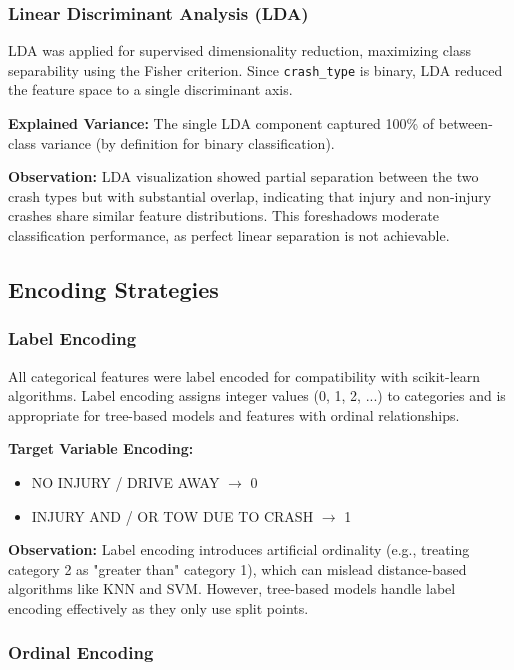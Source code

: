 \documentclass[12pt,man]{apa7}
\begin{document}
\subsubsection{Linear Discriminant Analysis (LDA)}

LDA was applied for supervised dimensionality reduction, maximizing class separability using the Fisher criterion. Since \texttt{crash\_type} is binary, LDA reduced the feature space to a single discriminant axis.

\textbf{Explained Variance:} The single LDA component captured 100\% of between-class variance (by definition for binary classification).

\textbf{Observation:} LDA visualization showed partial separation between the two crash types but with substantial overlap, indicating that injury and non-injury crashes share similar feature distributions. This foreshadows moderate classification performance, as perfect linear separation is not achievable.

\subsection{Encoding Strategies}

\subsubsection{Label Encoding}

All categorical features were label encoded for compatibility with scikit-learn algorithms. Label encoding assigns integer values (0, 1, 2, ...) to categories and is appropriate for tree-based models and features with ordinal relationships.

\textbf{Target Variable Encoding:}
\begin{itemize}
    \item NO INJURY / DRIVE AWAY $\rightarrow$ 0
    \item INJURY AND / OR TOW DUE TO CRASH $\rightarrow$ 1
\end{itemize}

\textbf{Observation:} Label encoding introduces artificial ordinality (e.g., treating category 2 as "greater than" category 1), which can mislead distance-based algorithms like KNN and SVM. However, tree-based models handle label encoding effectively as they only use split points.

\subsubsection{Ordinal Encoding}
\end{document}
